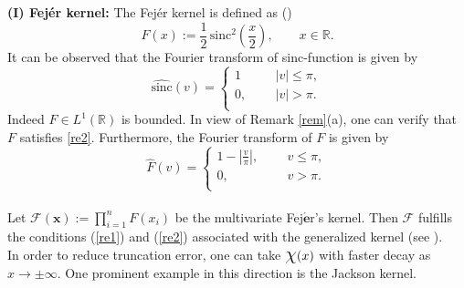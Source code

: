 \documentclass[11pt, a4paper]{article}
\theoremstyle{definition}
\numberwithin{equation}{section}
\def\RR{\mathbb R}
\def\Chi{\mbox{\Large$\chi$}}
\def\sinc{\text{sinc}}
\begin{document}
\textbf{(I) Fej\'er kernel:}
The Fej\'er kernel is defined as (\cite{bardaro10,multi})
$$F(x) :=\frac{1}{2}\,\sinc^{2}\left(\frac{x}{2}\right),\qquad x \in \RR.$$
It can be observed that the Fourier transform of sinc-function is given by
$$
\widehat{\sinc}(v) =
\begin{cases}
	{1} &\quad\text{} \ \  {|v| \leq \pi},\\
	{ 0,} &\quad\text{} \ \  {|v|>\pi}.\\
\end{cases}
$$
 Indeed $F \in L^1(\RR)$ is bounded. In view of Remark \ref{rem}(a), one can verify that $F$ satisfies \eqref{re2}. Furthermore, the Fourier transform of $F$ is given by
$$
\widehat{F}(v)=
\begin{cases}
	{1-|\frac{v}{\pi}|}, &\quad\text{} \ \  {v \leq \pi},\\
	{ 0,} &\quad\text{} \ \  {v>\pi}.\\
\end{cases}$$\\
Let $\displaystyle \mathcal{F}(\textbf{x}):=\prod_{i=1}^{n}  F(x_i)$ be the multivariate Fej$\mathbf{\acute{e}}$r's kernel. Then $\mathcal{F}$ fulfills the conditions (\ref{re1}) and (\ref{re2}) associated with the generalized kernel (see \cite{multi}).\\

In order to reduce truncation error, one can take \(\Chi(x)\) with faster decay as \(x \rightarrow \pm \infty\). One prominent example in this direction is the Jackson kernel.
\end{document}
